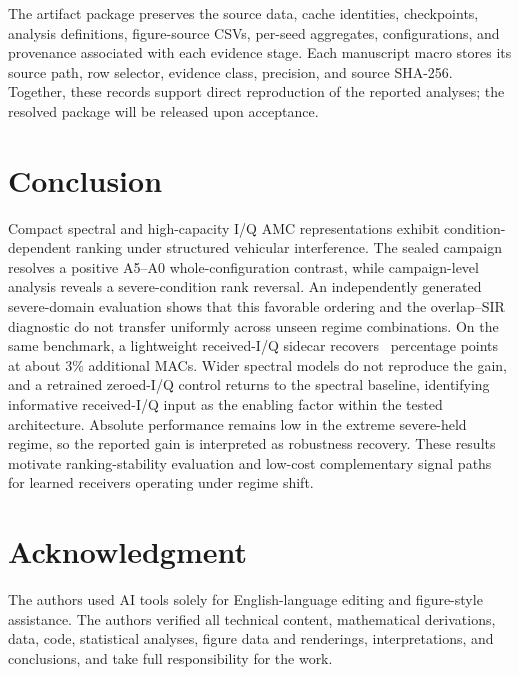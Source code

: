 \documentclass[letterpaper,journal]{IEEEtran}
\begin{document}
The artifact package preserves the source data, cache identities, checkpoints,
analysis definitions, figure-source CSVs, per-seed aggregates, configurations,
and provenance associated with each evidence stage. Each manuscript macro
stores its source path, row selector, evidence class, precision, and source
SHA-256. Together, these records support direct reproduction of the reported
analyses; the resolved package will be released upon acceptance.

\section{Conclusion}
Compact spectral and high-capacity I/Q AMC representations exhibit
condition-dependent ranking under structured vehicular interference. The
sealed campaign resolves a positive A5--A0 whole-configuration contrast, while
campaign-level analysis reveals a severe-condition rank reversal. An
independently generated severe-domain evaluation shows that this favorable
ordering and the overlap--SIR diagnostic do not transfer uniformly across
unseen regime combinations. On the same benchmark, a lightweight received-I/Q
sidecar recovers \SevereRepairDiff\ percentage points at about 3\% additional
MACs. Wider spectral models do not reproduce the gain, and a retrained
zeroed-I/Q control returns to the spectral baseline, identifying informative
received-I/Q input as the enabling factor within the tested architecture.
Absolute performance remains low in the extreme severe-held regime, so the
reported gain is interpreted as robustness recovery. These results motivate
ranking-stability evaluation and low-cost complementary signal paths for
learned receivers operating under regime shift.

\section*{Acknowledgment}
The authors used AI tools solely for English-language editing and figure-style
assistance. The authors verified all technical content, mathematical
derivations, data, code, statistical analyses, figure data and renderings,
interpretations, and conclusions, and take full responsibility for the work.



\end{document}
